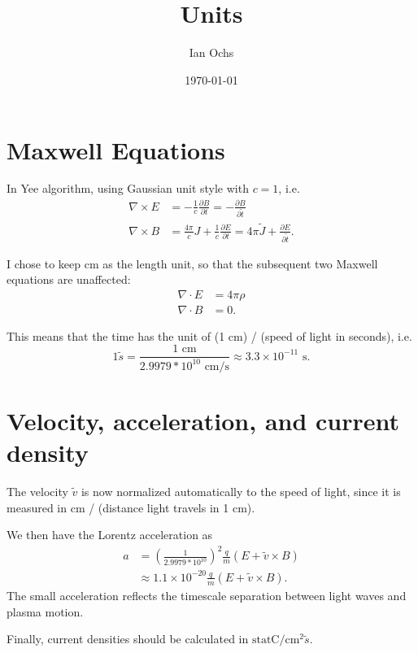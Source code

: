 \documentclass[paper=a4, fontsize=11pt]{scrartcl} %
\title{	
\horrule{0.5pt} \\[0.2cm] %
\huge Units \\[-0.2cm] %
\horrule{2pt} %
}
\author{Ian Ochs} %
\date{\normalsize\today} %
\numberwithin{equation}{section} %
\numberwithin{figure}{section} %
\numberwithin{table}{section} %
\begin{document}
\maketitle %


\section*{Maxwell Equations}

In Yee algorithm, using Gaussian unit style with $c = 1$, i.e.
\begin{align}
	\nabla \times E &= -\frac{1}{c} \frac{\partial B}{\partial t} = -\frac{\partial B}{\partial \tilde{t}}\\
	\nabla \times B &= \frac{4 \pi}{c} J + \frac{1}{c} \frac{\partial E}{\partial t} = 4 \pi \tilde{J} + \frac{\partial E}{\partial \tilde{t}}.
\end{align}

I chose to keep cm as the length unit, so that the subsequent two Maxwell equations are unaffected:
\begin{align}
	\nabla \cdot E &= 4 \pi \rho \\
	\nabla \cdot B &= 0.
\end{align}

This means that the time has the unit of (1 cm) / (speed of light in seconds), i.e.
\begin{equation}
	1 \tilde{s} = \frac{1 \text{ cm}}{2.9979 * 10^{10} \text{ cm/s}} \approx 3.3 \times 10^{-11} \text{ s}.
\end{equation}

\section*{Velocity, acceleration, and current density}

The velocity $\tilde{v}$ is now normalized automatically to the speed of light, since it is measured in cm / (distance light travels in 1 cm).

We then have the Lorentz acceleration as
\begin{align}
	a &= \left(\frac{1}{2.9979 * 10^{10}}\right)^2 \frac{q}{m} \left( E + \tilde{v} \times B \right)\\
	&\approx 1.1\times 10^{-20} \frac{q}{m} \left( E + \tilde{v} \times B \right).
\end{align}
The small acceleration reflects the timescale separation between light waves and plasma motion.

Finally, current densities should be calculated in $\text{statC} / \text{cm}^2 \tilde{s}$.





\end{document}
